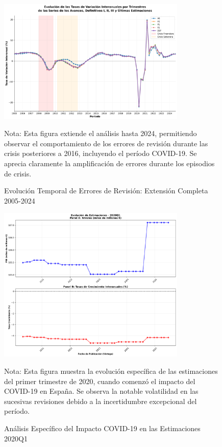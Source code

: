 \documentclass{article}
\begin{document}
\begin{figure}[h]
\centering
\includegraphics[width=0.8\textwidth]{../figuras/figura_2_pavia_robusta_2005_2024.png}
\caption{Evolución Temporal de Errores de Revisión: Extensión Completa 2005-2024}
\label{fig:evolucion_completa}
\begin{flushleft}
\footnotesize
Nota: Esta figura extiende el análisis hasta 2024, permitiendo observar el comportamiento de los errores de revisión durante las crisis posteriores a 2016, incluyendo el período COVID-19. Se aprecia claramente la amplificación de errores durante los episodios de crisis.
\end{flushleft}
\end{figure}

\begin{figure}[h]
\centering
\includegraphics[width=0.8\textwidth]{../figuras/evolucion_estimaciones_2020Q1_robusto.png}
\caption{Análisis Específico del Impacto COVID-19 en las Estimaciones 2020Q1}
\label{fig:covid_impact}
\begin{flushleft}
\footnotesize
Nota: Esta figura muestra la evolución específica de las estimaciones del primer trimestre de 2020, cuando comenzó el impacto del COVID-19 en España. Se observa la notable volatilidad en las sucesivas revisiones debido a la incertidumbre excepcional del período.
\end{flushleft}
\end{figure}
\end{document}
